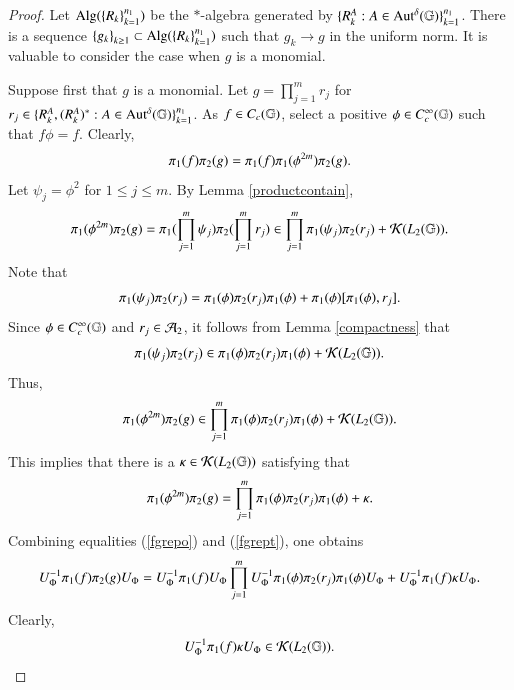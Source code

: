 \documentclass[leqno]{amsart}
\begin{document}
	\begin{proof}
		Let ${\rm Alg}(\left\{ R_{k} \right\}_{k=1}^{n_{1}})$ be the $*$-algebra generated by $\{{ R}^{A}_{k}:A\in{\rm Aut^{\delta}}(\mathbb{G})\}_{k=1}^{n_{1}}$.
		There is a sequence $\left\{ g_{k} \right\}_{k\geq1}\subset {\rm Alg}(\left\{ R_{k} \right\}_{k=1}^{n_{1}})$ such that $g_{k}\rightarrow g$ in the uniform norm.
		It is valuable to consider the case when $g$ is a monomial.
		
		Suppose first that $g$ is a monomial.
		Let $\displaystyle g=\prod_{j=1}^{m}r_{j}$ for $r_{j}\in\{{ R}^{A}_{k},({ R}^{A}_{k})^{*}:A\in{\rm Aut^{\delta}}(\mathbb{G})\}_{k=1}^{n_{1}}$.
		As $f\in C_{c}(\mathbb{G})$, select a positive $\phi\in C_{c}^{\infty}(\mathbb{G})$ such that $f\phi=f$. Clearly,
		\begin{align}\label{fgrepo}
			\pi_{1}(f)\pi_{2}(g)=\pi_{1}(f)\pi_{1}(\phi^{2m})\pi_{2}(g).
		\end{align}
		Let $\psi_{j}=\phi^{2}$ for $1\leq j\leq m$. By Lemma \ref{productcontain},
		\begin{align*}
			\pi_{1}(\phi^{2m})\pi_{2}(g)=\pi_{1}(\prod_{j=1}^{m}\psi_{j})\pi_{2}(\prod_{j=1}^{m}r_{j})\in\prod_{j=1}^{m}\pi_{1}(\psi_{j})\pi_{2}(r_{j})+{\mathcal K}(L_{2}(\mathbb{G})).
		\end{align*}
		Note that
		\begin{align*}
			\pi_{1}(\psi_{j})\pi_{2}(r_{j})=\pi_{1}(\phi)\pi_{2}(r_{j})\pi_{1}(\phi)+\pi_{1}(\phi)[\pi_{1}(\phi),r_{j}].
		\end{align*}
		Since $\phi\in C_{c}^{\infty}(\mathbb{G})$ and $r_{j}\in{\mathcal A}_{2}$, it follows from Lemma \ref{compactness} that
		\begin{align*}
			\pi_{1}(\psi_{j})\pi_{2}(r_{j})\in \pi_{1}(\phi)\pi_{2}(r_{j})\pi_{1}(\phi)+{\mathcal K}(L_{2}(\mathbb{G})).
		\end{align*}
		Thus,
		\begin{align*}
			\pi_{1}(\phi^{2m})\pi_{2}(g)\in\prod_{j=1}^{m}\pi_{1}(\phi)\pi_{2}(r_{j})\pi_{1}(\phi)+{\mathcal K}(L_{2}(\mathbb{G})).
		\end{align*}
		This implies that there is a $\kappa\in{\mathcal K}(L_{2}(\mathbb{G}))$ satisfying that
		\begin{align}\label{fgrept}
			\pi_{1}(\phi^{2m})\pi_{2}(g)=\prod_{j=1}^{m}\pi_{1}(\phi)\pi_{2}(r_{j})\pi_{1}(\phi)+\kappa.
		\end{align}
		Combining equalities (\ref{fgrepo}) and (\ref{fgrept}), one obtains
		\begin{align}\label{monomial-sum}
			U_{\Phi}^{-1}\pi_{1}(f)\pi_{2}(g)U_{\Phi}=
			U_{\Phi}^{-1}\pi_{1}(f)U_{\Phi}\prod_{j=1}^{m}U_{\Phi}^{-1}\pi_{1}(\phi)\pi_{2}(r_{j})\pi_{1}(\phi)U_{\Phi}
			+U_{\Phi}^{-1}\pi_{1}(f)\kappa U_{\Phi}.
		\end{align}
		Clearly,
		\begin{align*}
			U_{\Phi}\rp\po(f)\kappa U_{\Phi}\in\K(\lp{2}).

\end{align*}
\end{proof}
\end{document}
